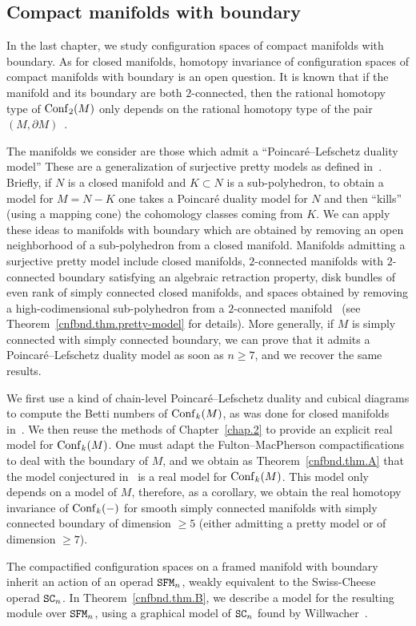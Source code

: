 \subsection{Compact manifolds with boundary}
\label{sec.comp-manif-with}

In the last chapter, we study configuration spaces of compact manifolds with boundary.
As for closed manifolds, homotopy invariance of configuration spaces of compact manifolds with boundary is an open question.
It is known that if the manifold and its boundary are both $2$-connected, then the rational homotopy type of $\operatorname{Conf}_{2}(M)$ only depends on the rational homotopy type of the pair $(M, \partial M)$~\cite{CordovaBulensLambrechtsStanley2015a}.

The manifolds we consider are those which admit a ``Poincaré--Lefschetz duality model''
These are a generalization of surjective pretty models as defined in~\cite{CordovaBulensLambrechtsStanley2015}.
Briefly, if $N$ is a closed manifold and $K \subset N$ is a sub-polyhedron, to obtain a model for $M = N - K$ one takes a Poincaré duality model for $N$ and then ``kills'' (using a mapping cone) the cohomology classes coming from $K$.
We can apply these ideas to manifolds with boundary which are obtained by removing an open neighborhood of a sub-polyhedron from a closed manifold.
Manifolds admitting a surjective pretty model include closed manifolds, $2$-connected manifolds with $2$-connected boundary satisfying an algebraic retraction property, disk bundles of even rank of simply connected closed manifolds, and spaces obtained by removing a high-codimensional sub-polyhedron from a $2$-connected manifold~\cite{CordovaBulensLambrechtsStanley2015,CordovaBulensLambrechtsStanley2015a} (see Theorem~\ref{cnfbnd.thm.pretty-model} for details).
More generally, if $M$ is simply connected with simply connected boundary, we can prove that it admits a Poincaré--Lefschetz duality model as soon as $n \geq 7$, and we recover the same results.

We first use a kind of chain-level Poincaré--Lefschetz duality and cubical diagrams to compute the Betti numbers of $\operatorname{Conf}_{k}(M)$, as was done for closed manifolds in~\cite{LambrechtsStanley2008a}.
We then reuse the methods of Chapter~\ref{chap.2} to provide an explicit real model for $\operatorname{Conf}_{k}(M)$.
One must adapt the Fulton--MacPherson compactifications to deal with the boundary of $M$, and we obtain as Theorem~\ref{cnfbnd.thm.A} that the model conjectured in~\cite{CordovaBulensLambrechtsStanley2015a} is a real model for $\operatorname{Conf}_{k}(M)$.
This model only depends on a model of $M$, therefore, as a corollary, we obtain the real homotopy invariance of $\operatorname{Conf}_{k}(-)$ for smooth simply connected manifolds with simply connected boundary of dimension $\geq 5$ (either admitting a pretty model or of dimension $\geq 7$).

The compactified configuration spaces on a framed manifold with boundary inherit an action of an operad $\mathtt{SFM}_{n}$, weakly equivalent to the Swiss-Cheese operad $\mathtt{SC}_{n}$.
In Theorem~\ref{cnfbnd.thm.B}, we describe a model for the resulting module over $\mathtt{SFM}_{n}$, using a graphical model of $\mathtt{SC}_{n}$ found by Willwacher~\cite{Willwacher2015a}.
